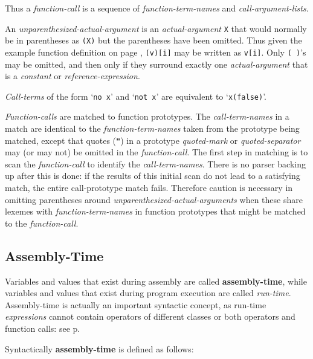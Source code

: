 \documentclass[12pt]{article}
\newcommand{\TT}[1]{{\tt \bfseries #1}}
\newcommand{\key}[1]{{\rm \bfseries #1}}
\newcommand{\pagref}[1]{p\pageref{#1}}
\begin{document}
Thus a {\em function-call} is a sequence of {\em function-term-names}
and {\em call-argument-lists}.

An {\em unparenthesized-actual-argument} is an {\em actual-argument}
{\tt X} that would normally be in parentheses as {\tt (X)} but the
parentheses have been omitted.  Thus given the example function definition
on page \pageref{REFERENCE-EXPRESSION-FUNCTION-EXAMPLE},
{\tt (v)[i]} may be written as {\tt v[i]}.  Only {\tt (~)}'s may be
omitted, and then only if they surround exactly one {\em actual-argument}
that is a {\em constant} or {\em reference-expression}.

{\em Call-terms} of the form `{\tt no x}' and `{\tt not x}' are
equivalent to `{\tt x(false)}'.

{\em Function-calls} are matched to function prototypes.  The
{\em call-term-names} in a match are identical to the
{\em function-term-names} taken from the prototype being matched, except
that quotes (\TT{"}) in a prototype {\em quoted-mark} or
{\em quoted-separator} may (or may not) be omitted in the
{\em function-call}.  The first
step in matching is to scan the {\em function-call} to identify the
{\em call-term-names}.  There is no parser backing up after this is
done: if the results of this initial scan do not lead to a satisfying
match, the entire call-prototype match fails.  Therefore caution
is necessary in omitting parentheses around
{\em unparenthesized-actual-arguments} when these share lexemes with
{\em function-term-names} in function prototypes that might be
matched to the {\em function-call}.

\subsection{Assembly-Time}
\label{ASSEMBLY-TIME}

Variables and values that exist during assembly are called
\key{assembly-time}, while variables and values that exist during
program execution are called {\em run-time}.  Assembly-time
is actually an important syntactic concept, as run-time
{\em expressions} cannot contain operators of different
classes or both operators and function calls: see
\pagref{RUN-TIME-EXPRESSION-LIMITS}.

Syntactically \key{assembly-time} is defined as follows:
\end{document}

